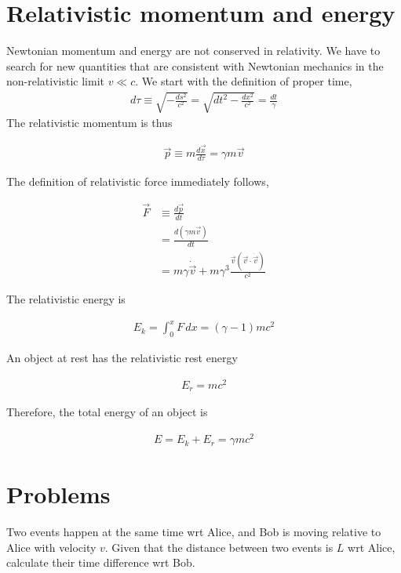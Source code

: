 \documentclass[12pt]{book} %
\numberwithin{equation}{chapter}
\def\c{\gamma}
\def\t{\tau}
\begin{document}
\section{Relativistic momentum and energy}
Newtonian momentum and energy are not conserved in relativity. We have to search for new quantities that are consistent with Newtonian mechanics in the non-relativistic limit $v\ll c$.\bigskip\newline
We start with the definition of proper time,
\begin{align*}
d\t\equiv\sqrt{-\frac{ds^{2}}{c^2}}=\sqrt{dt^{2}-\frac{dx^{2}}{c^2}}=\frac{dt}{\c}
\end{align*}
The relativistic momentum is thus
\begin{eqnbox}
\begin{align}
\vec{p}\equiv m\frac{d\vec{x}}{d\t}=\c m\vec{v}
\end{align}
\end{eqnbox}
The definition of relativistic force immediately follows,
\begin{eqnbox}
\begin{align}
\vec{F}&\equiv\frac{d\vec{p}}{dt}\nonumber\\
&=\frac{d(\c m\vec{v})}{dt}\nonumber\\
&=m\c\dot{\vec{v}}+m\c^{3}\frac{\vec{v}(\vec{v}\cdot{\dot{\vec{v}}})}{c^2}
\end{align}
\end{eqnbox}
The relativistic energy is
\begin{eqnbox}
\begin{align}
E_{k}=\int_{0}^{x}F\,dx=(\c-1)mc^2
\end{align}
\end{eqnbox}
An object at rest has the relativistic rest energy
\begin{eqnbox}
\begin{align}
E_{r}=mc^2
\end{align}
\end{eqnbox}
Therefore, the total energy of an object is
\begin{eqnbox}
\begin{align}
E=E_{k}+E_{r}=\c mc^2
\end{align}
\end{eqnbox}

\section*{Problems}
\begin{problem}
Two events happen at the same time wrt Alice, and Bob is moving relative to Alice with velocity $v$. Given that the distance between two events is $L$ wrt Alice, calculate their time difference wrt Bob.
\end{problem}
\end{document}
